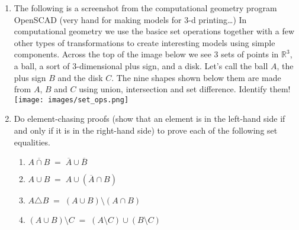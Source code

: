 \documentclass[10pt,]{book}
\theoremstyle{plain}
\theoremstyle{definition}
\theoremstyle{definition}
\numberwithin{equation}{section}
\newcommand{\Reals}{{\mathbb R}}
\begin{document}
\begin{enumerate}[label=(\alph*)]
\item\hypertarget{li-324}{}
        The following is a screenshot from the computational geometry program OpenSCAD (very hand for making models for 3-d printing\dots{})  In computational geometry we use the basice set operations together
        with a few other types of transformations to create interesting models using simple components.  Across the top of the image below we see 3 sets of points in \(\Reals^3\), a ball, a sort of 3-dimensional plus sign, and a disk.  Let's call the ball \(A\), the plus sign \(B\) and the disk \(C\).   The nine shapes shown below them are made from \(A\), \(B\) and \(C\) using union, intersection and set difference.  Identify them!
        \texttt{[image: images/set\_ops.png]}

\item\hypertarget{li-325}{}
    Do element-chasing proofs (show that an element is in the left-hand side if and only if it is in the right-hand side) to prove each of the following set equalities.

\begin{enumerate}[label=\roman*.]
\item\hypertarget{li-326}{}
          \(\overline{A\cap B} \; = \; \overline{A}\cup\overline{B}\)
\item\hypertarget{li-327}{}
          \(A\cup B \; = \; A\cup(\overline{A}\cap B)\)
\item\hypertarget{li-328}{}
          \(A\triangle B \; = \; (A\cup B)\setminus(A\cap B)\)
\item\hypertarget{li-329}{}
          \((A\cup B)\setminus C \; = \; (A\setminus C)\cup(B\setminus C)\)
\end{enumerate}


\end{enumerate}
\end{document}

